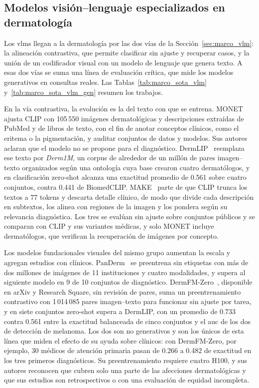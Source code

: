 \FloatBarrier
\subsection{Modelos visión--lenguaje especializados en dermatología}
\label{sec:estado_arte_vlm}

Los \glspl{vlm} llegan a la dermatología por las dos vías de la Sección~\ref{sec:marco_vlm}: la alineación
contrastiva, que permite clasificar sin ajuste y recuperar casos, y la unión de un codificador visual con un modelo
de lenguaje que genera texto. A esas dos vías se suma una línea de evaluación crítica, que mide los modelos
generativos en consultas reales. Las Tablas~\ref{tab:marco_sota_vlm} y~\ref{tab:marco_sota_vlm_gen} resumen los
trabajos.

En la vía contrastiva, la evolución es la del texto con que se entrena. MONET~\cite{kim2024transparent} ajusta CLIP
con 105\,550 imágenes dermatológicas y descripciones extraídas de PubMed y de libros de texto, con el fin de anotar
conceptos clínicos, como el eritema o la pigmentación, y auditar conjuntos de datos y modelos. Sus autores aclaran
que el modelo no se propone para el diagnóstico. DermLIP~\cite{yan2025derm1miccv} reemplaza ese texto por
\emph{Derm1M}, un corpus
de alrededor de un millón de pares imagen--texto organizados según una ontología cuya base crearon cuatro
dermatólogos, y en clasificación zero-shot alcanza una exactitud promedio de 0.561 sobre cuatro conjuntos,
contra 0.441 de BiomedCLIP. MAKE~\cite{yan2025makemiccai} parte de que CLIP trunca los textos a 77 tokens y
descarta detalle clínico, de modo que divide cada descripción en subtextos, los alinea con regiones de la imagen y
los pondera según su relevancia diagnóstica. Los tres se evalúan sin ajuste sobre conjuntos públicos y se comparan
con CLIP y sus variantes médicas, y solo MONET incluye dermatólogos, que verifican la recuperación de imágenes por
concepto.

Los modelos fundacionales visuales del mismo grupo aumentan la escala y agregan estudios con clínicos.
PanDerm~\cite{yan2025vision} se preentrena sin etiquetas con más de dos millones de imágenes de 11 instituciones y
cuatro modalidades, y supera al siguiente modelo en 9 de 10 conjuntos de diagnóstico.
DermFM-Zero~\cite{yan2026dermfmzero}, disponible en arXiv y Research Square, sin revisión de pares, suma un
preentrenamiento contrastivo con 1\,014\,085 pares imagen--texto para funcionar sin ajuste por tarea, y en siete
conjuntos zero-shot supera a DermLIP, con un promedio de 0.733 contra 0.561 entre la exactitud balanceada de
cinco conjuntos y el \gls{auc} de los dos de detección de melanoma. Los dos son no generativos y son
los únicos de esta línea que miden el efecto de su ayuda sobre clínicos: con DermFM-Zero, por ejemplo, 30 médicos de
atención primaria pasan de 0.266 a 0.482 de exactitud en los tres primeros diagnósticos. Su preentrenamiento
requiere cuatro H100, y sus autores reconocen que cubren solo una parte de las afecciones dermatológicas y que sus
estudios son retrospectivos o con una evaluación de equidad incompleta.

